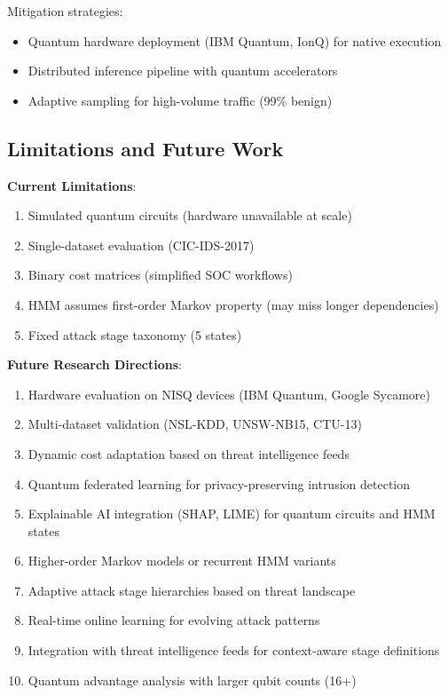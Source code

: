 \documentclass[conference]{IEEEtran}
\begin{document}
Mitigation strategies:
\begin{itemize}
    \item Quantum hardware deployment (IBM Quantum, IonQ) for native execution
    \item Distributed inference pipeline with quantum accelerators
    \item Adaptive sampling for high-volume traffic (99\% benign)
\end{itemize}

\subsection{Limitations and Future Work}
\textbf{Current Limitations}:
\begin{enumerate}
    \item Simulated quantum circuits (hardware unavailable at scale)
    \item Single-dataset evaluation (CIC-IDS-2017)
    \item Binary cost matrices (simplified SOC workflows)
    \item HMM assumes first-order Markov property (may miss longer dependencies)
    \item Fixed attack stage taxonomy (5 states)
\end{enumerate}

\textbf{Future Research Directions}:
\begin{enumerate}
    \item Hardware evaluation on NISQ devices (IBM Quantum, Google Sycamore)
    \item Multi-dataset validation (NSL-KDD, UNSW-NB15, CTU-13)
    \item Dynamic cost adaptation based on threat intelligence feeds
    \item Quantum federated learning for privacy-preserving intrusion detection
    \item Explainable AI integration (SHAP, LIME) for quantum circuits and HMM states
    \item Higher-order Markov models or recurrent HMM variants
    \item Adaptive attack stage hierarchies based on threat landscape
    \item Real-time online learning for evolving attack patterns
    \item Integration with threat intelligence feeds for context-aware stage definitions
    \item Quantum advantage analysis with larger qubit counts (16+)
\end{enumerate}
\end{document}
